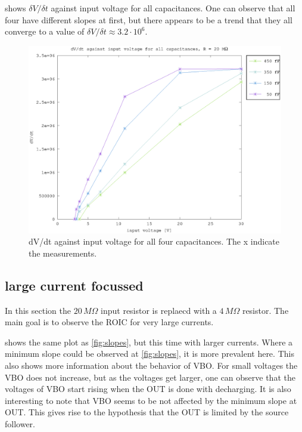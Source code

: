 \documentclass{article}
\begin{document}
 shows $\delta V / \delta t$ against input voltage for all capacitances. One can observe that all four have different slopes at first, but there appears to be a trend that they all converge to a value of $\delta V/\delta t \approx 3.2\cdot10^6$.


\begin{figure}[h]
	    \centering
	    \includegraphics[width=\textwidth]{fig/vin_vs_time_sat.eps}
	    \caption[]%
	    {dV/dt against input voltage for all four capacitances. The x indicate the measurements.}    
	    \label{fig:e_vs_m}	
\end{figure}



\clearpage
\subsection{large current  focussed}
In this section the $20\,M\Omega$ input resistor is replaecd with a $4\,M\Omega$ resistor. The main goal is to observe the ROIC for very large currents.


 shows the same plot as \cref{fig:slopes}, but this time with larger currents. Where a minimum slope could be observed at \cref{fig:slopes}, it is more prevalent here. This also shows more information about the behavior of VBO. For small voltages the VBO does not increase, but as the voltages get larger, one can observe that the voltages of VBO start rising when the OUT is done with decharging. It is also interesting to note that VBO seems to be not affected by the minimum slope at OUT. This gives rise to the hypothesis that the OUT is limited by the source follower. 
\end{document}

